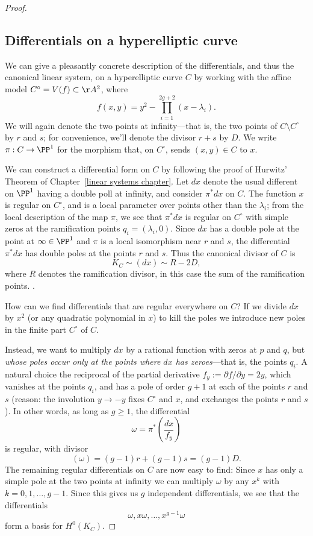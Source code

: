 \begin{proof}
  \subsection{Differentials on a hyperelliptic curve}

We can give a pleasantly concrete description of the differentials, and thus the canonical linear system, on a hyperelliptic curve $C$ by working with the affine model $C^\circ = V(f) \subset \AA^2$, where
$$
f(x,y) = y^2 - \prod_{i=1}^{2g+2} (x - \lambda_i).
$$
We will again denote the two points at infinity---that is, the two points of $C \setminus C^\circ$ by $r$ and $s$; for convenience, we'll denote the divisor $r+s$ by $D$. We write $\pi:C \to \PP^1$ for the morphism that, on $C^\circ$, sends $(x,y) \in C$ to $x$.

We can construct a differential form on $C$ by following the proof of Hurwitz' Theorem of Chapter~\ref{linear systems chapter}.
Let $dx$ denote the usual different on $\PP^1$ having a double poll at infinity, and consider $\pi^*dx$ on $C$.  The function $x$ is regular on $C^\circ$, and is a local parameter over points other than the $\lambda_i$; from the local description of the map $\pi$, we see that $\pi^*dx$ is regular on $C^\circ$  with simple zeros at the ramification points $q_i = (\lambda_i, 0)$. Since $dx$ has a double pole at the point at $\infty\in \PP^1$ and $\pi$ is a local isomorphism near $r$ and $s$, the differential $\pi^*dx$ has double poles at the points $r$ and $s$. Thus the canonical
divisor of $C$ is 
$$
K_C \sim (dx) \sim R - 2D,
$$
where $R$ denotes the ramification divisor, in this case the sum of the ramification points. .

How can we find differentials that are regular everywhere on $C$? If we divide $dx$ by $x^2$ (or any quadratic polynomial in $x$) to kill the poles we  introduce new poles in the finite part $C^\circ$ of $C$. 

Instead, we want to multiply $dx$ by a rational function with zeros at $p$ and $q$, but \emph{whose poles occur only at the points where $dx$ has zeroes}---that is, the points $q_i$.  A natural choice the reciprocal of the partial derivative $f_y := \partial f/ \partial y = 2y$, which vanishes at the points $q_i$, and has  a pole of order $g+1$ at each of the points $r$ and $s$ (reason: the involution $y\to -y$ fixes $C^\circ$ and $x$, and exchanges the points $r$ and $s$). In other words, as long as $g \geq 1$, the differential
$$
\omega = \pi^*(\frac{dx}{f_y})
$$
is regular, with divisor
$$
(\omega) = (g-1)r + (g-1)s = (g-1)D.
$$
The remaining regular differentials on $C$ are now easy to find: Since $x$ has only a simple pole
at the two points at infinity we can  multiply $\omega$ by any $x^k$ with $k = 0, 1, \dots, g-1$. Since this gives us $g$ independent differentials, we see that the differentials
$$
\omega, x\omega, \dots, x^{g-1}\omega
$$
  form a basis for $H^0(K_C)$.


\end{proof}
